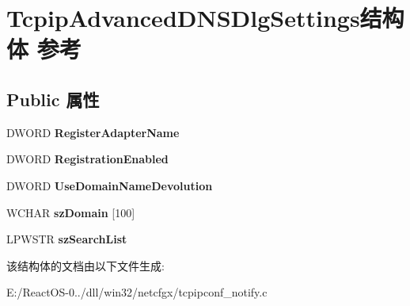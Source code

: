 \hypertarget{struct_tcpip_advanced_d_n_s_dlg_settings}{}\section{Tcpip\+Advanced\+D\+N\+S\+Dlg\+Settings结构体 参考}
\label{struct_tcpip_advanced_d_n_s_dlg_settings}
\subsection*{Public 属性}
\begin{DoxyCompactItemize}
\item 
\mbox{\label{struct_tcpip_advanced_d_n_s_dlg_settings_aa7d8eb4cc45692630617c50be73e201b}} 
D\+W\+O\+RD {\bfseries Register\+Adapter\+Name}
\item 
\mbox{\label{struct_tcpip_advanced_d_n_s_dlg_settings_a346897f53486bc475cdf9a6dca2b3e80}} 
D\+W\+O\+RD {\bfseries Registration\+Enabled}
\item 
\mbox{\label{struct_tcpip_advanced_d_n_s_dlg_settings_a8216e85893ab8b0e3294fcbd6ec50003}} 
D\+W\+O\+RD {\bfseries Use\+Domain\+Name\+Devolution}
\item 
\mbox{\label{struct_tcpip_advanced_d_n_s_dlg_settings_a56283190de8dc8d68b01ea8780efea5d}} 
W\+C\+H\+AR {\bfseries sz\+Domain} \mbox{[}100\mbox{]}
\item 
\mbox{\label{struct_tcpip_advanced_d_n_s_dlg_settings_a86ff492fde33d1742b7320264ce15edf}} 
L\+P\+W\+S\+TR {\bfseries sz\+Search\+List}
\end{DoxyCompactItemize}


该结构体的文档由以下文件生成\+:\begin{DoxyCompactItemize}
\item 
E\+:/\+React\+O\+S-\/0../dll/win32/netcfgx/tcpipconf\+\_\+notify.\+c\end{DoxyCompactItemize}
